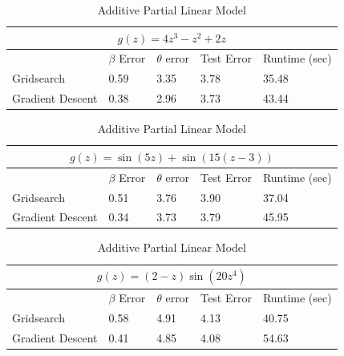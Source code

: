 \documentclass[10pt,letterpaper]{article}
\begin{document}
\begin{table}
\begin{center}
\begin{tabular}{| l | l | l | l | l | }
\hline
\multicolumn{5}{|c|}{$g(z) = 4z^3 - z^2 + 2z$}\\
\hline
 & $\beta$ Error & $\theta$ error & Test Error & Runtime (sec) \\
\hline
Gridsearch & 0.59 & 3.35 & 3.78 & 35.48 \\
\hline
Gradient Descent & 0.38 & 2.96 & 3.73 & 43.44 \\
\hline
\end{tabular}

\begin{tabular}{| l | l | l | l | l | }
\hline
\multicolumn{5}{|c|}{$g(z) = \sin(5z) + \sin(15(z - 3))$}\\
\hline
 & $\beta$ Error & $\theta$ error & Test Error & Runtime (sec) \\
\hline
Gridsearch & 0.51 & 3.76 & 3.90 & 37.04 \\
\hline
Gradient Descent & 0.34 & 3.73 & 3.79 & 45.95 \\
\hline
\end{tabular}

\begin{tabular}{| l | l | l | l | l | }
\hline
\multicolumn{5}{|c|}{$g(z) = (2-z)\sin(20z^4)$}\\
\hline
 & $\beta$ Error & $\theta$ error & Test Error & Runtime (sec) \\
\hline
Gridsearch & 0.58 & 4.91 & 4.13 & 40.75 \\
\hline
Gradient Descent & 0.41 & 4.85 & 4.08 & 54.63 \\
\hline
\end{tabular}
\end{center}
\caption {Additive Partial Linear Model}
\label{ref:aplm}
\end{table}
\end{document}
